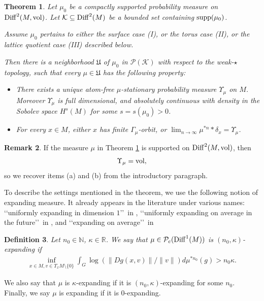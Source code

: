 \documentclass[11pt, leqno, fleqn]{amsart}
\def\cU{\mathfrak U}
\def \R{{\mathbb R}}
\def \N{{\mathbb N}}
\newcommand{\cP}{{\mathcal P}}
\newcommand{\cK}{{\mathcal K}}
\newcommand{\aryst}{\begin{eqnarray*}}
\newcommand{\earyst}{\end{eqnarray*}}
\newtheorem{thm}{\bf Theorem}[section]
\newtheorem{defi}[thm]{\bf Definition}
\theoremstyle{definition}
\newtheorem{rema}[thm]{\bf Remark}
\theoremstyle{definition}
\def\supp{{\rm supp}}
\def \vol{  {\rm vol} }
\newcommand{\Diff}{{\rm Diff}}
\begin{document}
\begin{thm} \label{examplesI,II,III}
Let $\mu_{0}$ be a compactly supported probability measure on $\Diff^2(M, \vol)$.  Let  $\cK \subseteq\Diff^{2}(M)$ be a bounded set containing $\supp(\mu_0)$.

Assume $\mu_{0}$ pertains  to either the surface case (I), or the torus case (II), or the lattice quotient case (III) described below. 

	Then there is   a neighborhood $\cU$  of $\mu_0$ in $\cP(\cK)$ with respect to the weak-$\star$ topology, such that  every  $\mu \in \cU$ has the following property: 
	\begin{itemize}
	\item[(a)] There exists a unique atom-free $\mu$-stationary probability measure $ \Upsilon_{\mu}$ on $M$. Moreover  $\Upsilon_{\mu}$ is full dimensional, and absolutely continuous with density in the Sobolev space $H^s(M)$ for some $s=s(\mu_{0})>0$.
	
	\item[(b)] For every  $x \in M$, either $x$ has finite $\Gamma_{\mu}$-orbit, or $\lim_{n \to \infty} \mu^{*n} * \delta_{x} = \Upsilon_{\mu}$.   
	\end{itemize}
\end{thm} 			
			
\begin{rema}
If the measure $\mu$ in Theorem \ref{examplesI,II,III}   is supported on $ \Diff^2(M, \vol)$, then  $$\Upsilon_{\mu} = \vol,$$ so we recover items (a) and (b) from the introductory paragraph. 
\end{rema}
			
			To describe the  settings mentioned in the theorem, we use the following  notion of expanding measure. 	It  already appears in the literature under various names:  \lq\lq uniformly expanding in dimension $1$\rq\rq \	in \cite{BEFRH},  \lq\lq uniformly expanding on average in the future\rq\rq \  in \cite{BLOR1},  and   \lq\lq expanding on average\rq\rq  \ in \cite{DD}	
					
	\begin{defi} \label{def expandingonaverage}
		Let $n_{0}\in \N$, $\kappa\in \R$. We say that $\mu \in \cP_c(\Diff^1(M))$ is $(n_{0}, \kappa)$-{\rm expanding} if 
		\aryst
	\inf_{x \in M, v \in T_xM \setminus \{0\}}	\int_{G} \log (\| Dg(x, v) \| / \| v \|) d\mu^{* n_0}(g) > n_{0}\kappa.
		\earyst 
	\end{defi}			
		\noindent	We also say that $\mu$ is $ \kappa$-expanding if it is $(n_{0}, \kappa)$-expanding for some $n_{0}$. Finally, we say $\mu$ is expanding if it is $0$-expanding.
			
\end{document}
